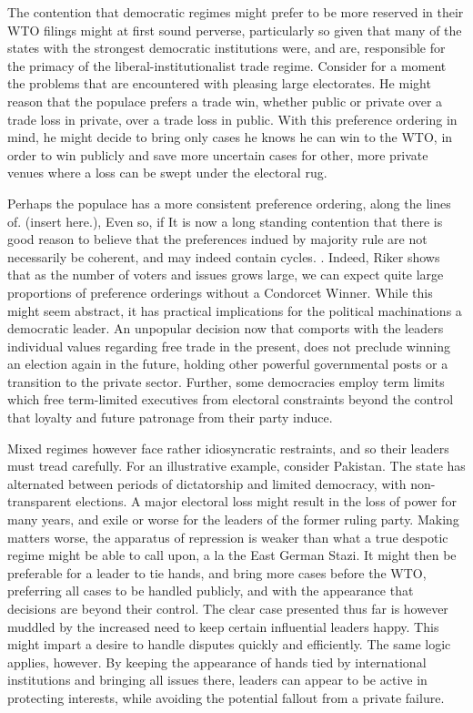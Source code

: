 \documentclass[]{article}
\begin{document}
The contention that democratic regimes might prefer to be more reserved in their WTO filings might at first sound perverse, particularly so given that many of the states with the strongest democratic institutions were, and are, responsible for the primacy of the liberal-institutionalist trade regime.  Consider for a moment the problems that are encountered with pleasing large electorates. He might reason that the populace prefers a trade win, whether public or private over a trade loss in private, over a trade loss in public. With this preference ordering in mind, he might decide to bring only cases he knows he can win to the WTO, in order to win publicly and save more uncertain cases for other, more private venues where a loss can be swept under the electoral rug. 

 Perhaps the populace has a more consistent preference ordering, along the lines of. (insert here.), Even so, if It is now a long standing contention that  there is good reason to believe that the preferences indued by majority rule are not necessarily be coherent, and may indeed contain cycles. \cite{Arrow}. Indeed, Riker shows that as the number of voters and issues grows large, we can expect quite large proportions of preference orderings without a Condorcet Winner. While this might seem abstract, it has practical implications for the political machinations a democratic leader. An unpopular decision now that comports with the leaders individual values regarding free trade in the present, does not preclude winning an election again in the future, holding other powerful governmental posts or a transition to the private sector. Further, some democracies employ term limits which free term-limited executives from electoral constraints beyond the control that loyalty and future patronage from their party induce.  

  Mixed regimes however face rather idiosyncratic restraints, and so their leaders must tread carefully. For an illustrative example, consider Pakistan. The state has alternated between periods of dictatorship and limited democracy, with non-transparent elections. A major electoral loss might result in the loss of power for many years, and exile or worse for the leaders of the former ruling party.  Making matters worse, the apparatus of repression is weaker than what a true despotic regime might be able to call upon, a la the East German Stazi. It might then be preferable for a leader to tie hands, and bring more cases before the WTO, preferring all cases to be handled publicly, and with the appearance that decisions are beyond their control. The clear case presented thus far is however muddled by the increased need to keep certain influential leaders happy. This might impart a desire to handle disputes quickly and efficiently. The same logic applies, however. By keeping the appearance of hands tied by international institutions and bringing all issues there, leaders can appear to be active in protecting interests, while avoiding the potential fallout from a private failure. 
\end{document}
